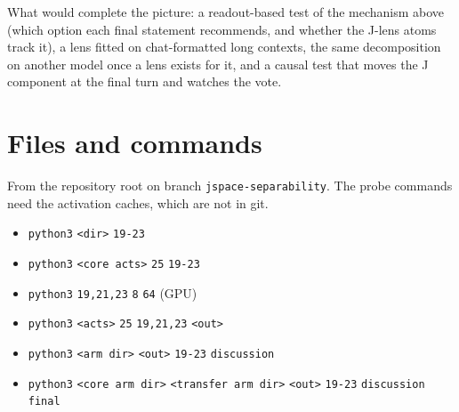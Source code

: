 \documentclass[11pt,a4paper]{article}
\begin{document}
What would complete the picture: a readout-based test of the mechanism above (which option each final statement recommends, and whether the J-lens atoms track it), a lens fitted on chat-formatted long contexts, the same decomposition on another model once a lens exists for it, and a causal test that moves the J component at the final turn and watches the vote.

\section{Files and commands}

From the repository root on branch \texttt{jspace-separability}. The probe commands need the activation caches, which are not in git.

\begin{itemize}[leftmargin=1.4em,itemsep=0.1em]\raggedright
\item \texttt{python3}     \texttt{<dir>}    \texttt{19-23} 
\item \texttt{python3}   \texttt{<core acts>}  \texttt{25}  \texttt{19-23}
\item \texttt{python3}     \texttt{19,21,23}  \texttt{8}  \texttt{64}   (GPU)
\item \texttt{python3}   \texttt{<acts>}      \texttt{25}  \texttt{19,21,23}  \texttt{<out>}
\item \texttt{python3}   \texttt{<arm dir>}  \texttt{<out>}  \texttt{19-23}  \texttt{discussion}
\item \texttt{python3}   \texttt{<core arm dir>}  \texttt{<transfer arm dir>}  \texttt{<out>}  \texttt{19-23}  \texttt{discussion}  \texttt{final}

\end{itemize}
\end{document}
